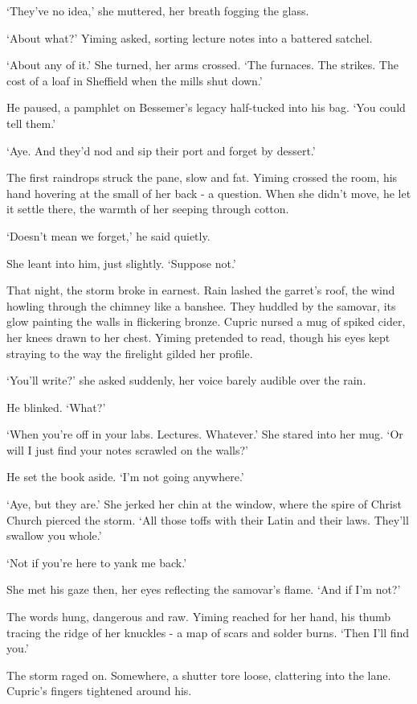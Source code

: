 `They've no idea,' she muttered, her breath fogging the glass.

`About what?' Yiming asked, sorting lecture notes into a battered satchel.

`About any of it.' She turned, her arms crossed. `The furnaces. The strikes. The cost of a loaf in Sheffield when the mills shut down.'

He paused, a pamphlet on Bessemer's legacy half-tucked into his bag. `You could tell them.'

`Aye. And they'd nod and sip their port and forget by dessert.'

The first raindrops struck the pane, slow and fat. Yiming crossed the room, his hand hovering at the small of her back - a question. When she didn't move, he let it settle there, the warmth of her seeping through cotton.

`Doesn't mean we forget,' he said quietly.

She leant into him, just slightly. `Suppose not.'

That night, the storm broke in earnest. Rain lashed the garret's roof, the wind howling through the chimney like a banshee. They huddled by the samovar, its glow painting the walls in flickering bronze. Cupric nursed a mug of spiked cider, her knees drawn to her chest. Yiming pretended to read, though his eyes kept straying to the way the firelight gilded her profile.

`You'll write?' she asked suddenly, her voice barely audible over the rain.

He blinked. `What?'

`When you're off in your labs. Lectures. Whatever.' She stared into her mug. `Or will I just find your notes scrawled on the walls?'

He set the book aside. `I'm not going anywhere.'

`Aye, but they are.' She jerked her chin at the window, where the spire of Christ Church pierced the storm. `All those toffs with their Latin and their laws. They'll swallow you whole.'

`Not if you're here to yank me back.'

She met his gaze then, her eyes reflecting the samovar's flame. `And if I'm not?'

The words hung, dangerous and raw. Yiming reached for her hand, his thumb tracing the ridge of her knuckles - a map of scars and solder burns. `Then I'll find you.'

The storm raged on. Somewhere, a shutter tore loose, clattering into the lane. Cupric's fingers tightened around his.

